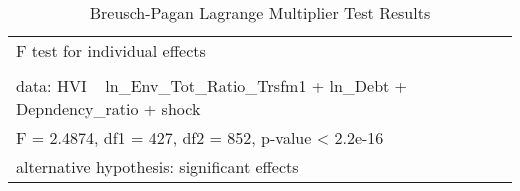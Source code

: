 \begin{table}[ht]
\centering
\begin{tabular}{p{10cm}}
\hline
F test for individual effects\\
\\
data: HVI ~ ln_Env_Tot_Ratio_Trsfm1 + ln_Debt + Depndency_ratio + shock\\
F = 2.4874, df1 = 427, df2 = 852, p-value < 2.2e-16\\
alternative hypothesis: significant effects\\
\hline
\end{tabular}
\caption{Breusch-Pagan Lagrange Multiplier Test Results}
\label{tab:bplm_results}
\end{table}